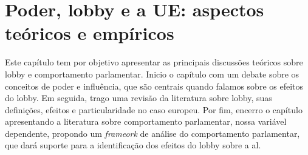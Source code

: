 \chapter{Poder, lobby e a UE: aspectos teóricos e empíricos}
\label{chapter:poder}

Este capítulo tem por objetivo apresentar as principais discussões teóricos sobre lobby e comportamento parlamentar. Inicio o capítulo com um debate sobre os conceitos de poder e influência, que são centrais quando falamos sobre os efeitos do lobby. Em seguida, trago uma revisão da literatura sobre lobby, suas definições, efeitos e particularidade no caso europeu. Por fim, encerro o capítulo apresentando a literatura sobre comportamento parlamentar, nossa variável dependente, propondo um \textit{frameork} de análise do comportamento parlamentar, que dará suporte para a identificação dos efeitos do lobby sobre a \acrshort{al}.



